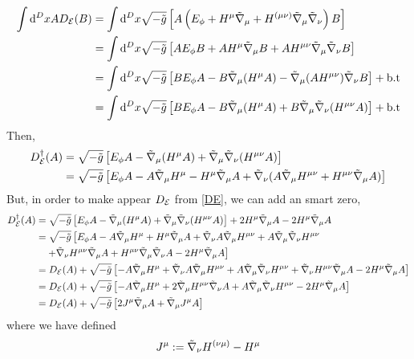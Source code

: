 \begin{align}
  \int\dd^DxAD_{\mathcal{E}} (B)&=\int\dd^Dx\sqrt{-\tilde{g}}\left[A\left(E_\phi +H^\mu\tilde{\nabla}_\mu +H^{(\mu\nu )}\tilde{\nabla}_\mu\tilde{\nabla}_\nu\right)B\right]\\
  &=\int\dd^Dx\sqrt{-\tilde{g}}\left[AE_\phi B +AH^\mu \tilde{\nabla}_\mu B+AH^{\mu\nu }\tilde{\nabla}_\mu\tilde{\nabla}_\nu B\right]\\
  &=\int\dd^Dx\sqrt{-\tilde{g}}\left[BE_\phi A-B\tilde{\nabla}_\mu (H^\mu A)-\tilde{\nabla}_\mu (AH^{\mu\nu })\tilde{\nabla}_\nu B\right]+\rm b.t\\
  &=\int\dd^Dx\sqrt{-\tilde{g}}\left[BE_\phi A-B\tilde{\nabla}_\mu (H^\mu A)+B\tilde{\nabla}_\mu\tilde{\nabla}_\nu (H^{\mu\nu }A)\right]+\rm b.t
\end{align}
Then, 
\begin{align}
  D^\dagger_{\mathcal{E}} (A)&=\sqrt{-\tilde{g}}\left[E_\phi A-\tilde{\nabla}_\mu (H^\mu A)+\tilde{\nabla}_\mu\tilde{\nabla}_\nu (H^{\mu\nu }A)\right]\\
  &=\sqrt{-\tilde{g}}\left[E_\phi A-A\tilde{\nabla}_\mu H^\mu -H^\mu \tilde{\nabla}_\mu A+\tilde{\nabla}_\nu (A\tilde{\nabla}_\mu H^{\mu\nu }+H^{\mu\nu }\tilde{\nabla}_\mu A)\right]
\end{align}
But, in order to make appear $D_{\mathcal{E}}$ from \eqref{DE}, we can add an smart zero,
\begin{align*}
  D^\dagger_{\mathcal{E}} (A)&=\sqrt{-\tilde{g}}\left[E_\phi A-\tilde{\nabla}_\mu (H^\mu A)+\tilde{\nabla}_\mu\tilde{\nabla}_\nu (H^{\mu\nu }A)\right]+2H^\mu \tilde{\nabla}_\mu A-2H^\mu \tilde{\nabla}_\mu A\\
  &=\sqrt{-\tilde{g}}\left[E_\phi A-A\tilde{\nabla}_\mu H^\mu +H^\mu \tilde{\nabla}_\mu A+\tilde{\nabla}_\nu A\tilde{\nabla}_\mu H^{\mu\nu }+A\tilde{\nabla}_\mu \tilde{\nabla}_\nu H^{\mu\nu }\right. \\
  &\left.\quad +\tilde{\nabla}_\nu H^{\mu\nu }\tilde{\nabla}_\mu A +H^{\mu\nu }\tilde{\nabla}_\mu \tilde{\nabla}_\nu A -2H^\mu \tilde{\nabla}_\mu A\right]\\
  &=D_{\mathcal{E}} (A)+\sqrt{-\tilde{g}}\left[-A\tilde{\nabla}_\mu H^\mu +\tilde{\nabla}_\nu A\tilde{\nabla}_\mu H^{\mu\nu }+A\tilde{\nabla}_\mu \tilde{\nabla}_\nu H^{\mu\nu }+\tilde{\nabla}_\nu H^{\mu\nu }\tilde{\nabla}_\mu A-2H^\mu \tilde{\nabla}_\mu A\right]\\
  &=D_{\mathcal{E}} (A)+\sqrt{-\tilde{g}}\left[-A\tilde{\nabla}_\mu H^\mu +2\tilde{\nabla}_\mu H^{\mu\nu }\tilde{\nabla}_\nu A+A\tilde{\nabla}_\mu \tilde{\nabla}_\nu H^{\mu\nu }-2H^\mu \tilde{\nabla}_\mu A\right]\\
  &=D_{\mathcal{E}} (A)+\sqrt{-\tilde{g}}\left[2J^\mu \tilde{\nabla}_\mu A+\tilde{\nabla}_\mu J^\mu A\right]
\end{align*}
where we have defined
\begin{equation}
  J^\mu :=\tilde{\nabla}_\nu H^{(\nu\mu) }-H^\mu 
\end{equation}

